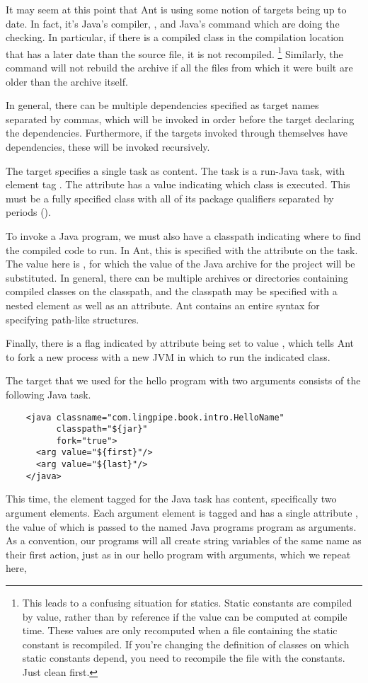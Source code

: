 It may seem at this point that Ant is using some notion of targets
being up to date.  In fact, it's Java's compiler, , and
Java's  command which are doing the checking.  In
particular, if there is a compiled class in the compilation location
that has a later date than the source file, it is not recompiled.%
%
\footnote{This leads to a confusing situation for statics.  Static
constants are compiled by value, rather than by reference if the value
can be computed at compile time.  These values are only recomputed
when a file containing the static constant is recompiled.  If you're
changing the definition of classes on which static constants depend,
you need to recompile the file with the constants.  Just clean first.}
%
Similarly, the  command will not rebuild the archive if
all the files from which it were built are older than the archive
itself.

In general, there can be multiple dependencies specified as target
names separated by commas, which will be invoked in order before the
target declaring the dependencies.  Furthermore, if the targets
invoked through  themselves have dependencies, these
will be invoked recursively.

The  target specifies a single task as content.  The task
is a run-Java task, with element tag .  The attribute
 has a value indicating which class is executed.  This
must be a fully specified class with all of its package qualifiers
separated by periods ().  

To invoke a Java program, we must also have a classpath indicating where
to find the compiled code to run.  In Ant, this is specified with
the  attribute on the  task.  The value here
is , for which the value of the Java archive for the
project will be substituted.  In general, there can be multiple archives
or directories containing compiled classes on the classpath, and the
classpath may be specified with a nested element as well as an attribute.
Ant contains an entire syntax for specifying path-like structures.

Finally, there is a flag indicated by attribute  being
set to value , which tells Ant to fork a new process with
a new JVM in which to run the indicated class.  

The target  that we used for the hello program with
two arguments consists of the following Java task.
%
\begin{verbatim}
    <java classname="com.lingpipe.book.intro.HelloName"
          classpath="${jar}"
          fork="true">
      <arg value="${first}"/>
      <arg value="${last}"/>
    </java>
\end{verbatim}
%
This time, the element tagged  for the Java task has
content, specifically two argument elements.  Each argument element is
tagged  and has a single attribute , the value
of which is passed to the named Java programs  program as
arguments.  As a convention, our programs will all create string
variables of the same name as their first action, just as in our
hello program with arguments, which we repeat here,
%

